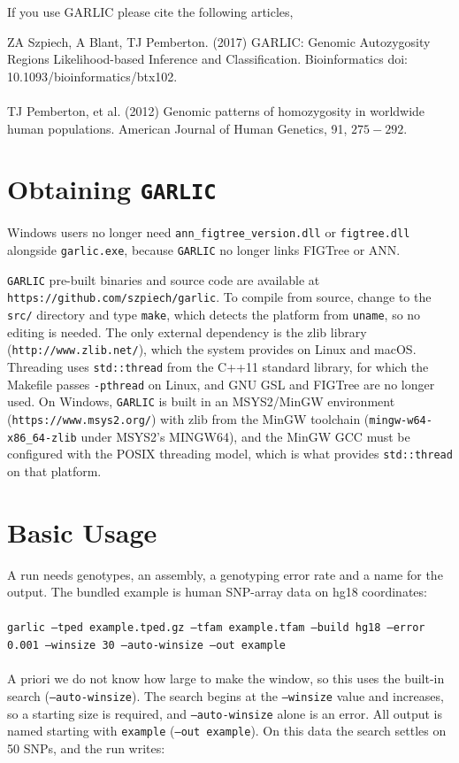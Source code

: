 \documentclass[12pt]{article}%
\begin{document}
If you use GARLIC please cite the following articles,

\noindent ZA Szpiech, A Blant, TJ Pemberton. (2017) GARLIC: Genomic Autozygosity Regions Likelihood-based Inference and Classification. Bioinformatics doi: 10.1093/bioinformatics/btx102.
\\\\
TJ Pemberton, et al. (2012) Genomic patterns of homozygosity in worldwide human populations. American Journal of Human Genetics, 91, $275-292$.

\section{Obtaining {\tt GARLIC}}

Windows users no longer need {\tt ann\_figtree\_version.dll} or {\tt figtree.dll} alongside {\tt garlic.exe}, because {\tt GARLIC} no longer links FIGTree or ANN.

{\tt GARLIC} pre-built binaries and source code are available at {\tt https://github.com/szpiech/garlic}.  To compile from source, change to the {\tt src/} directory and type {\tt make}, which detects the platform from {\tt uname}, so no editing is needed.  The only external dependency is the zlib library ({\tt http://www.zlib.net/}), which the system provides on Linux and macOS.  Threading uses {\tt std::thread} from the C++11 standard library, for which the Makefile passes {\tt -pthread} on Linux, and GNU GSL and FIGTree are no longer used.  On Windows, {\tt GARLIC} is built in an MSYS2/MinGW environment ({\tt https://www.msys2.org/}) with zlib from the MinGW toolchain ({\tt mingw-w64-x86\_64-zlib} under MSYS2's MINGW64), and the MinGW GCC must be configured with the POSIX threading model, which is what provides {\tt std::thread} on that platform.

\section{Basic Usage}

A run needs genotypes, an assembly, a genotyping error rate and a name for the
output.  The bundled example is human SNP-array data on hg18 coordinates:
~\\\\
{\tt garlic --tped example.tped.gz --tfam example.tfam --build hg18 --error 0.001 --winsize 30 --auto-winsize --out example}
~\\\\
\noindent A priori we do not know how large to make the window, so this uses
the built-in search ({\tt --auto-winsize}).  The search begins at the
{\tt --winsize} value and increases, so a starting size is required, and
{\tt --auto-winsize} alone is an error.  All output is named starting with
{\tt example} ({\tt --out example}).  On this data the search settles on 50
SNPs, and the run writes:
\end{document}
